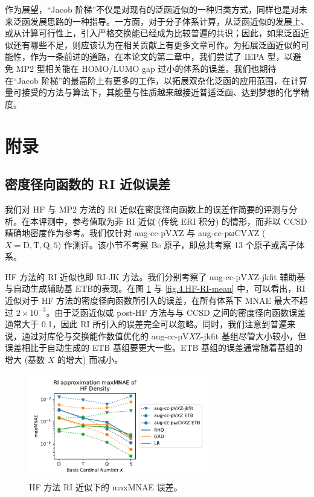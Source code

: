 作为展望，“Jacob 阶梯”不仅是对现有的泛函近似的一种归类方式，同样也是对未来泛函发展思路的一种指导。一方面，对于分子体系计算，从泛函近似的发展上、或从计算可行性上，引入严格交换能已经成为比较普遍的共识；因此，如果泛函近似还有哪些不足，则应该认为在相关贡献上有更多文章可作。为拓展泛函近似的可能性，作为一条前进的道路，在本论文的第二章中，我们尝试了 IEPA 型，以避免 MP2 型相关能在 HOMO/LUMO gap 过小的体系的误差。我们也期待在“Jacob 阶梯”的最高阶上有更多的工作，以拓展双杂化泛函的应用范围，在计算量可接受的方法与算法下，其能量与性质越来越接近普适泛函、达到梦想的化学精度。

\section{附录}

\subsection{密度径向函数的 RI 近似误差}

我们对 HF 与 MP2 方法的 RI 近似在密度径向函数上的误差作简要的评测与分析。在本评测中，参考值取为非 RI 近似 (传统 ERI 积分) 的情形，而非以 CCSD 精确地密度作为参考。我们仅针对 aug-cc-pV$X$Z 与 aug-cc-pωCV$X$Z ($X=\mathrm{D,T,Q,5}$) 作测评。该小节不考察 Be 原子，即总共考察 13 个原子或离子体系。

HF 方法的 RI 近似也即 RI-JK 方法。我们分别考察了 aug-cc-pV$X$Z-jkfit 辅助基与自动生成辅助基 ETB\cite{Stoychev-Neese.JCTC.2017}的表现。在图 \ref{fig.4.HF-RI-err} 与 \ref{fig.4.HF-RI-mean} 中，可以看出，RI 近似对于 HF 方法的密度径向函数所引入的误差，在所有体系下 MNAE 最大不超过 $2 \times 10^{-3}$。由于泛函近似或 post-HF 方法与与 CCSD 之间的密度径向函数误差通常大于 0.1，因此 RI 所引入的误差完全可以忽略。同时，我们注意到普遍来说，通过对库伦与交换能作数值优化的 aug-cc-pV$X$Z-jkfit 基组尽管大小较小，但误差相比于自动生成的 ETB 基组要更大一些。ETB 基组的误差通常随着基组的增大 (基数 $X$ 的增大) 而减小。

\begin{figure}[t]
  \centering
  \includegraphics[width=0.7\textwidth]{assets/HF-RI-err.pdf}
  \caption{HF 方法 RI 近似下的 maxMNAE 误差。}
  \label{fig.4.HF-RI-err}
\end{figure}

